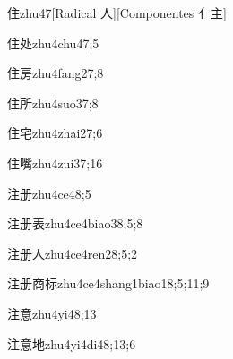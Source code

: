 \begin{verbete}{住}{zhu4}{7}[Radical 人][Componentes 亻主]
\end{verbete}

\begin{verbete}{住处}{zhu4chu4}{7;5}
\end{verbete}

\begin{verbete}{住房}{zhu4fang2}{7;8}
\end{verbete}

\begin{verbete}{住所}{zhu4suo3}{7;8}
\end{verbete}

\begin{verbete}{住宅}{zhu4zhai2}{7;6}
\end{verbete}

\begin{verbete}{住嘴}{zhu4zui3}{7;16}
\end{verbete}

\begin{verbete}{注册}{zhu4ce4}{8;5}
\end{verbete}

\begin{verbete}{注册表}{zhu4ce4biao3}{8;5;8}
\end{verbete}

\begin{verbete}{注册人}{zhu4ce4ren2}{8;5;2}
\end{verbete}

\begin{verbete}{注册商标}{zhu4ce4shang1biao1}{8;5;11;9}
\end{verbete}

\begin{verbete}{注意}{zhu4yi4}{8;13}
\end{verbete}

\begin{verbete}{注意地}{zhu4yi4di4}{8;13;6}
\end{verbete}

